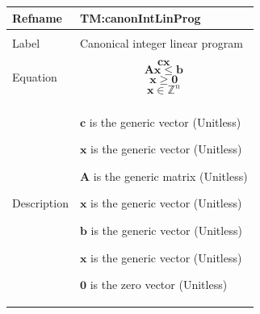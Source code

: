 \documentclass[12pt]{article}
\begin{document}
\vspace{\baselineskip}
\noindent
\begin{minipage}{\textwidth}
\begin{tabular}{>{\raggedright}p{}>{\raggedright\arraybackslash}p{}}
\toprule \textbf{Refname} & \textbf{TM:canonIntLinProg}
\label{TM:canonIntLinProg}
\\ \midrule \\
Label & Canonical integer linear program
        
\\ \midrule \\
Equation & \begin{displaymath}
           \symbf{c} \symbf{x}
           \end{displaymath}
           \begin{displaymath}
           \symbf{A} \symbf{x}\leq{}\symbf{b}
           \end{displaymath}
           \begin{displaymath}
           \symbf{x}\geq{}\symbf{0}
           \end{displaymath}
           \begin{displaymath}
           \symbf{x}\in{}\mathbb{Z}^{n}
           \end{displaymath}
\\ \midrule \\
Description & \begin{symbDescription}
              \item{$\symbf{c}$ is the generic vector (Unitless)}
              \item{$\symbf{x}$ is the generic vector (Unitless)}
              \end{symbDescription}
              \begin{symbDescription}
              \item{$\symbf{A}$ is the generic matrix (Unitless)}
              \item{$\symbf{x}$ is the generic vector (Unitless)}
              \item{$\symbf{b}$ is the generic vector (Unitless)}
              \end{symbDescription}
              \begin{symbDescription}
              \item{$\symbf{x}$ is the generic vector (Unitless)}
              \item{$\symbf{0}$ is the zero vector (Unitless)}
              \end{symbDescription}

\end{tabular}
\end{minipage}
\end{document}
